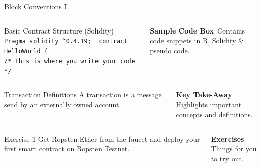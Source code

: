 \documentclass[]{beamer}
\begin{document}
\begin{frame}{Block Conventions I}
	
	\begin{columns}[T]
		\begin{column}{0.45\textwidth}
			\vspace{-1.0em}
			\begin{exampleblock}{Basic Contract Structure (Solidity)}
	 			\texttt{
					Pragma solidity  \textasciicircum 0.4.19; \
					contract HelloWorld \{ \\
					\color{softanthracite} /* This is where you write your code */
	 			}
			\end{exampleblock}			
		\end{column} %
		\begin{column}{0.5\textwidth}
			\textbf{Sample Code Box}\
			Contains code snippets in R, Solidity \& pseudo code.
		\end{column}
	\end{columns}

\vspace{2.0em}

	\begin{columns}[T]
		\begin{column}{0.45\textwidth}
			\vspace{-1.0em}
			\begin{alertblock}{Transaction Definitions}
				A transaction is a message send by an externally owned account.
			\end{alertblock}		
		\end{column}
		\begin{column}{0.5\textwidth}
			\textbf{Key Take-Away}\\
			Highlights important concepts and definitions.
		\end{column}
	\end{columns}

\vspace{2.0em}

	\begin{columns}[T]
		\begin{column}{0.45\textwidth}
			\vspace{-1.0em}
			\begin{block}{Exercise 1}
				Get Ropsten Ether from the faucet and deploy your first smart contract on Ropsten Testnet.
			\end{block}		
		\end{column}
		\begin{column}{0.5\textwidth}
		\textbf{Exercises}\\
			Things for you to try out.
		\end{column}
	\end{columns}

\end{frame}
\end{document}
